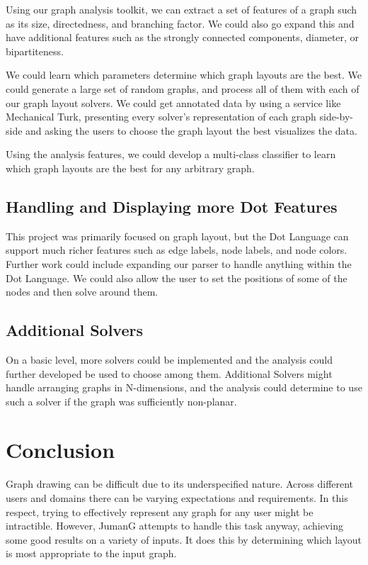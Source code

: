 \documentclass{article}
\begin{document}
Using our graph analysis toolkit, we can extract a set of features of a graph such as its size, directedness, and branching factor. We could also go expand this and have additional features such as the strongly connected components, diameter, or bipartiteness.

We could learn which parameters determine which graph layouts are the best. We could generate a large set of random graphs, and process all of them with each of our graph layout solvers. We could get annotated data by using a service like Mechanical Turk, presenting every solver's representation of each graph side-by-side and asking the users to choose the graph layout the best visualizes the data.

Using the analysis features, we could develop a multi-class classifier to learn which graph layouts are the best for any arbitrary graph.


\subsection{Handling and Displaying more Dot Features}
This project was primarily focused on graph layout, but the Dot Language can support much richer features such as edge labels, node labels, and node colors. Further work could include expanding our parser to handle anything within the Dot Language. We could also allow the user to set the positions of some of the nodes and then solve around them.


\subsection{Additional Solvers}
On a basic level, more solvers could be implemented and the analysis could further developed be used to choose among them. Additional Solvers might handle arranging graphs in N-dimensions, and the analysis could determine to use such a solver if the graph was sufficiently non-planar.



\section{Conclusion}
Graph drawing can be difficult due to its underspecified nature. Across different users and domains there can be varying expectations and requirements. In this respect, trying to effectively represent any graph for any user might be intractible. However, JumanG attempts to handle this task anyway, achieving some good results on a variety of inputs. It does this by determining which layout is most appropriate to the input graph.





\end{document}
